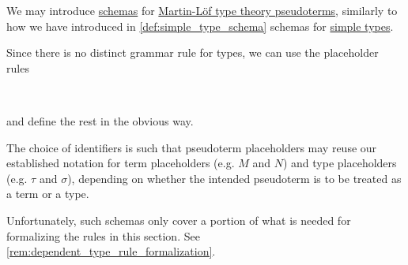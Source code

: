 \begin{remark}\label{rem:pseudoterm_schemas}
  We may introduce \hyperref[con:schemas_and_instances]{schemas} for \hyperref[def:mltt_pseudoterm]{Martin-L\"of type theory pseudoterms}, similarly to how we have introduced in \cref{def:simple_type_schema} schemas for \hyperref[def:simple_type]{simple types}.

  Since there is no distinct grammar rule for types, we can use the placeholder rules
  \begin{bnf*}
       {} \\
     { \bnfor {}}
  \end{bnf*}
  and define the rest in the obvious way.

  The choice of identifiers is such that pseudoterm placeholders may reuse our established notation for term placeholders (e.g. \( M \) and \( N \)) and type placeholders (e.g. \( \tau \) and \( \sigma \)), depending on whether the intended pseudoterm is to be treated as a term or a type.

  Unfortunately, such schemas only cover a portion of what is needed for formalizing the rules in this section. See \cref{rem:dependent_type_rule_formalization}.
\end{remark}

